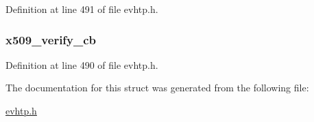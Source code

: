 \-Definition at line 491 of file evhtp.\-h.

\hypertarget{structevhtp__ssl__cfg__s_afcc514daa3570553ab171826205601c6}{
\subsubsection[{x509\-\_\-verify\-\_\-cb}]{ {\bf x509\-\_\-verify\-\_\-cb}}}\label{structevhtp__ssl__cfg__s_afcc514daa3570553ab171826205601c6}


\-Definition at line 490 of file evhtp.\-h.



\-The documentation for this struct was generated from the following file\-:\begin{DoxyCompactItemize}
\item 
\hyperlink{evhtp_8h}{evhtp.\-h}\end{DoxyCompactItemize}
